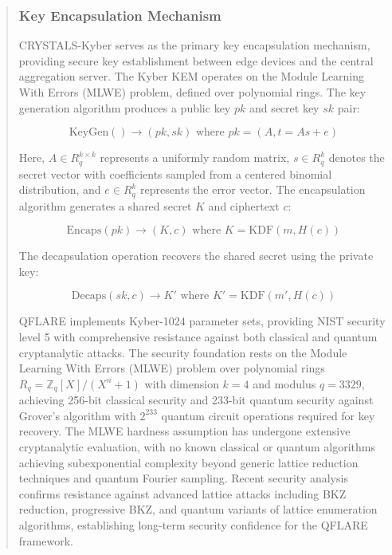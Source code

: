 \documentclass{svproc}
\begin{document}
\begin{abstract}
\subsubsection{Key Encapsulation Mechanism}

CRYSTALS-Kyber serves as the primary key encapsulation mechanism, providing secure key establishment between edge devices and the central aggregation server. The Kyber KEM operates on the Module Learning With Errors (MLWE) problem, defined over polynomial rings. The key generation algorithm produces a public key $pk$ and secret key $sk$ pair:

\begin{equation}
\text{KeyGen}() \rightarrow (pk, sk) \text{ where } pk = (A, t = As + e)
\end{equation}

Here, $A \in R_q^{k \times k}$ represents a uniformly random matrix, $s \in R_q^k$ denotes the secret vector with coefficients sampled from a centered binomial distribution, and $e \in R_q^k$ represents the error vector. The encapsulation algorithm generates a shared secret $K$ and ciphertext $c$:

\begin{equation}
\text{Encaps}(pk) \rightarrow (K, c) \text{ where } K = \text{KDF}(m, H(c))
\end{equation}

The decapsulation operation recovers the shared secret using the private key:

\begin{equation}
\text{Decaps}(sk, c) \rightarrow K' \text{ where } K' = \text{KDF}(m', H(c))
\end{equation}

QFLARE implements Kyber-1024 parameter sets, providing NIST security level 5 with comprehensive resistance against both classical and quantum cryptanalytic attacks. The security foundation rests on the Module Learning With Errors (MLWE) problem over polynomial rings $R_q = \mathbb{Z}_q[X]/(X^n + 1)$ with dimension $k = 4$ and modulus $q = 3329$, achieving 256-bit classical security and 233-bit quantum security against Grover's algorithm with $2^{233}$ quantum circuit operations required for key recovery. The MLWE hardness assumption has undergone extensive cryptanalytic evaluation, with no known classical or quantum algorithms achieving subexponential complexity beyond generic lattice reduction techniques and quantum Fourier sampling. Recent security analysis confirms resistance against advanced lattice attacks including BKZ reduction, progressive BKZ, and quantum variants of lattice enumeration algorithms, establishing long-term security confidence for the QFLARE framework.


\end{abstract}
\end{document}
